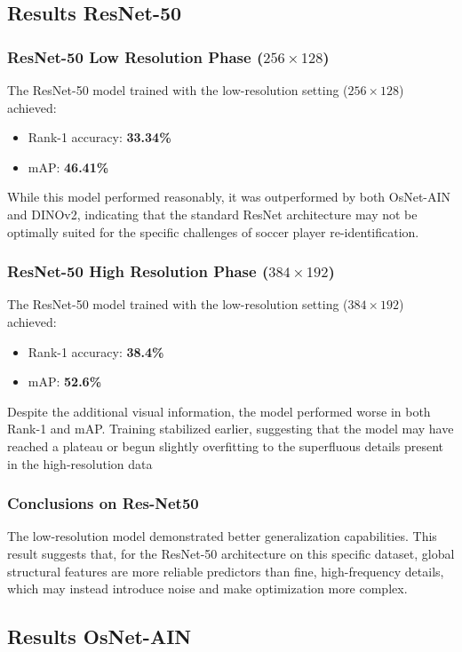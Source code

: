 \documentclass[10pt,twocolumn,letterpaper]{article}
\begin{document}
\subsection{Results ResNet-50}
\subsubsection{ResNet-50 Low Resolution Phase ($256 \times 128$)}
The ResNet-50 model trained with the low-resolution setting ($256 \times 128$) achieved:
\begin{itemize}
    \item Rank-1 accuracy: \textbf{33.34\%}
    \item mAP: \textbf{46.41\%}
\end{itemize}
While this model performed reasonably, it was outperformed by both OsNet-AIN and DINOv2, indicating that the standard ResNet architecture may not be optimally suited for the specific challenges of soccer player re-identification.

\subsubsection{ResNet-50 High Resolution Phase ($384 \times 192$)}
The ResNet-50 model trained with the low-resolution setting ($384 \times 192$) achieved:
\begin{itemize} 
\item Rank-1 accuracy: \textbf{38.4\%}
\item mAP: \textbf{52.6\%} 
\end{itemize} 
Despite the additional visual information, the model performed worse in both Rank-1 and mAP. Training stabilized earlier, suggesting that the model may have reached a plateau or begun slightly overfitting to the superfluous details present in the high-resolution data

\subsubsection{Conclusions on Res-Net50}
The low-resolution model demonstrated better generalization capabilities. This result suggests that, for the ResNet-50 architecture on this specific dataset, global structural features are more reliable predictors than fine, high-frequency details, which may instead introduce noise and make optimization more complex.
\subsection{Results OsNet-AIN}
\end{document}

